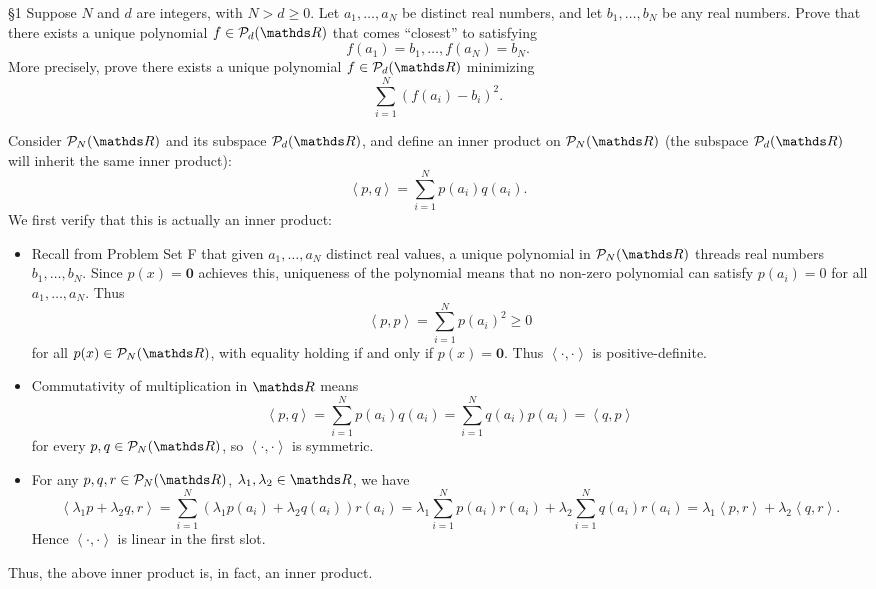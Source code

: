 \documentclass{homework}
\begin{document}
\begin{problem}{\S 1}
  Suppose $N$ and $d$ are integers, with $N>d\ge 0$. Let $a_1,\ldots,a_N$ be distinct real numbers,
  and let $b_1,\ldots,b_N$ be any real numbers. Prove that there exists a unique polynomial $f\in
  \mc{P}_d(\R)$ that comes ``closest'' to satisfying \[
    f(a_1)=b_1,\ldots,f(a_N)=b_N
  .\] More precisely, prove there exists a unique polynomial $f\in \mc{P}_d(\R)$ minimizing \[
  \sum_{i=1}^{N} (f(a_i)-b_i)^2
  .\] 
\end{problem}
\begin{solution}
  Consider $\mc{P}_N(\R)$ and its subspace $\mc{P}_d(\R)$, and define an inner product on
  $\mc{P}_N(\R)$ (the subspace $\mc{P}_d(\R)$ will inherit the same inner product): \[
    \left<p,q \right> =\sum_{i=1}^{N} p(a_i)q(a_i)
  .\] We first verify that this is actually an inner product:
  \begin{itemize}
    \item Recall from Problem Set F that given $a_1,\ldots,a_N$ distinct real values, a unique
      polynomial in $\mc{P}_N(\R)$ threads real numbers $b_1,\ldots,b_N$. Since $p(x)=\textbf{0}$
      achieves this, uniqueness of the polynomial means that no non-zero polynomial can satisfy
      $p(a_i)=0$ for all $a_1,\ldots,a_N$. Thus \[
        \left<p,p \right> =\sum_{i=1}^{N} p(a_i)^2\ge 0
      \] for all $p(x)\in \mc{P}_N(\R)$, with equality holding if and only if $p(x)=\textbf{0}$.
      Thus $\left<\cdot ,\cdot  \right> $ is positive-definite.
    \item Commutativity of multiplication in $\R$ means \[
        \left<p,q \right> =\sum_{i=1}^{N} p(a_i)q(a_i)=\sum_{i=1}^{N} q(a_i)p(a_i)=\left<q,p \right>
      \] for every $p,q\in \mc{P}_N(\R)$, so $\left<\cdot ,\cdot  \right> $ is symmetric.
    \item For any $p,q,r\in \mc{P}_N(\R)$, $\lambda_1,\lambda_2\in \R$, we have \[
        \left<\lambda_1p+\lambda_2q,r \right> =\sum_{i=1}^{N}
        (\lambda_1p(a_i)+\lambda_2q(a_i))r(a_i)=\lambda_1\sum_{i=1}^{N}p(a_i)r(a_i)+\lambda_2
        \sum_{i=1}^{N} q(a_i)r(a_i)=\lambda_1\left<p,r \right> +\lambda_2\left<q,r \right> 
      .\] Hence $\left<\cdot ,\cdot  \right> $ is linear in the first slot.
  \end{itemize}
  Thus, the above inner product is, in fact, an inner product.


\end{solution}
\end{document}
